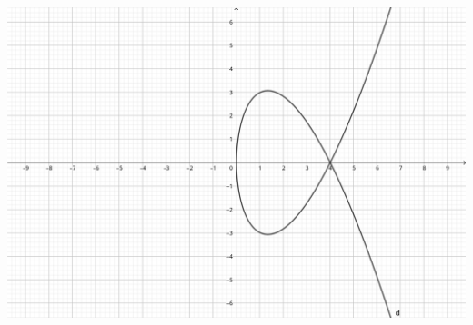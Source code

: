 \documentclass[../practica_02.tex]{subfiles}
\begin{document}
\begin{enumerate}
            \includegraphics[scale=0.2]{ej01/resources/ej01d.png} $ $
    \end{enumerate}
\end{document}
